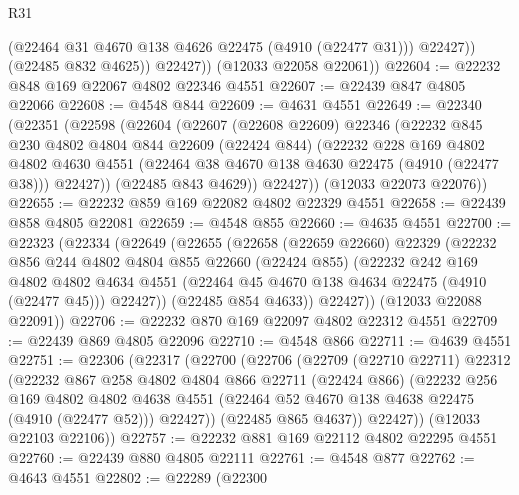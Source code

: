 \begin{lexlean}{R31}
\begin{coremodule}
                (@22464 @31 @4670 @138 @4626 @22475 (@4910 (@22477 @31)))
                @22427))
            (@22485 @832 @4625))
          @22427))
      (@12033 @22058 @22061))
@22604 := @22232 @848 @169 @22067 @4802 @22346 @4551
@22607 := @22439 @847 @4805 @22066
@22608 := @4548 @844
@22609 := @4631 @4551
@22649 := @22340
    (@22351
      (@22598
        (@22604
          (@22607
            (@22608 @22609)
            @22346
            (@22232
              @845
              @230
              @4802
              @4804
              @844
              @22609
              (@22424 @844)
              (@22232
                @228
                @169
                @4802
                @4802
                @4630
                @4551
                (@22464 @38 @4670 @138 @4630 @22475 (@4910 (@22477 @38)))
                @22427))
            (@22485 @843 @4629))
          @22427))
      (@12033 @22073 @22076))
@22655 := @22232 @859 @169 @22082 @4802 @22329 @4551
@22658 := @22439 @858 @4805 @22081
@22659 := @4548 @855
@22660 := @4635 @4551
@22700 := @22323
    (@22334
      (@22649
        (@22655
          (@22658
            (@22659 @22660)
            @22329
            (@22232
              @856
              @244
              @4802
              @4804
              @855
              @22660
              (@22424 @855)
              (@22232
                @242
                @169
                @4802
                @4802
                @4634
                @4551
                (@22464 @45 @4670 @138 @4634 @22475 (@4910 (@22477 @45)))
                @22427))
            (@22485 @854 @4633))
          @22427))
      (@12033 @22088 @22091))
@22706 := @22232 @870 @169 @22097 @4802 @22312 @4551
@22709 := @22439 @869 @4805 @22096
@22710 := @4548 @866
@22711 := @4639 @4551
@22751 := @22306
    (@22317
      (@22700
        (@22706
          (@22709
            (@22710 @22711)
            @22312
            (@22232
              @867
              @258
              @4802
              @4804
              @866
              @22711
              (@22424 @866)
              (@22232
                @256
                @169
                @4802
                @4802
                @4638
                @4551
                (@22464 @52 @4670 @138 @4638 @22475 (@4910 (@22477 @52)))
                @22427))
            (@22485 @865 @4637))
          @22427))
      (@12033 @22103 @22106))
@22757 := @22232 @881 @169 @22112 @4802 @22295 @4551
@22760 := @22439 @880 @4805 @22111
@22761 := @4548 @877
@22762 := @4643 @4551
@22802 := @22289
    (@22300

\end{coremodule}
\end{lexlean}
